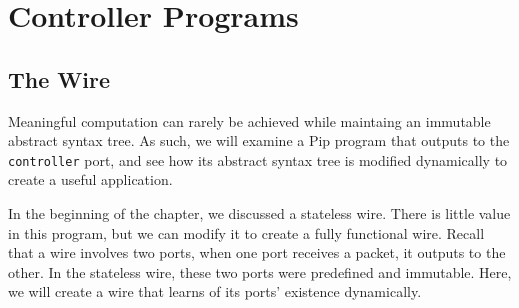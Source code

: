\section{Controller Programs}
\subsection{The Wire}
Meaningful computation can rarely be achieved while maintaing an immutable abstract syntax tree. As such, we will examine a Pip program that outputs to the \texttt{controller} port, and see how its abstract syntax tree is modified dynamically to create a useful application.

In the beginning of the chapter, we discussed a stateless wire. There is little value in this program, but we can modify it to create a fully functional wire. Recall that a wire involves two ports, when one port receives a packet, it outputs to the other. In the stateless wire, these two ports were predefined and immutable. Here, we will create a wire that learns of its ports' existence dynamically.

